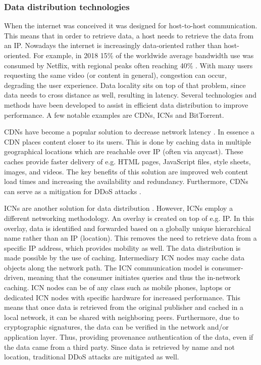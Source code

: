 \subsubsection{Data distribution technologies}
\label{introduction-ndn}
When the internet was conceived it was designed for host-to-host communication. This means that in order to retrieve data, a host needs to retrieve the data from an IP. Nowadays the internet is increasingly data-oriented rather than host-oriented. For example, in 2018 15\% of the worldwide average bandwidth use was consumed by Netflix, with regional peaks often reaching 40\% \cite{introduction-netflix}. With many users requesting the same video (or content in general), congestion can occur, degrading the user experience. Data locality sits on top of that problem, since data needs to cross distance as well, resulting in latency. Several technologies and methods have been developed to assist in efficient data distribution to improve performance. A few notable examples are CDNs, ICNs and BitTorrent.

CDNs have become a popular solution to decrease network latency \cite{lee2012towards}. In essence a CDN places content closer to its users. This is done by caching data in multiple geographical locations which are reachable over IP (often via anycast). These caches provide faster delivery of e.g. HTML pages, JavaScript files, style sheets, images, and videos. The key benefits of this solution are improved web content load times and increasing the availability and redundancy. Furthermore, CDNs can serve as a mitigation for DDoS attacks \cite{cloudflare-cdn}.

ICNs are another solution for data distribution \cite{jacobson2009networking}. However, ICNs employ a different networking methodology. An overlay is created on top of e.g. IP. In this overlay, data is identified and forwarded based on a globally unique hierarchical name rather than an IP (location). This removes the need to retrieve data from a specific IP address, which provides mobility as well. The data distribution is made possible by the use of caching. Intermediary ICN nodes may cache data objects along the network path. The ICN communication model is consumer-driven, meaning that the consumer initiates queries and thus the in-network caching. ICN nodes can be of any class such as mobile phones, laptops or dedicated ICN nodes with specific hardware for increased performance. This means that once data is retrieved from the original publisher and cached in a local network, it can be shared with neighboring peers. Furthermore, due to cryptographic signatures, the data can be verified in the network and/or application layer. Thus, providing provenance authentication of the data, even if the data came from a third party. Since data is retrieved by name and not location, traditional DDoS attacks are mitigated as well.


